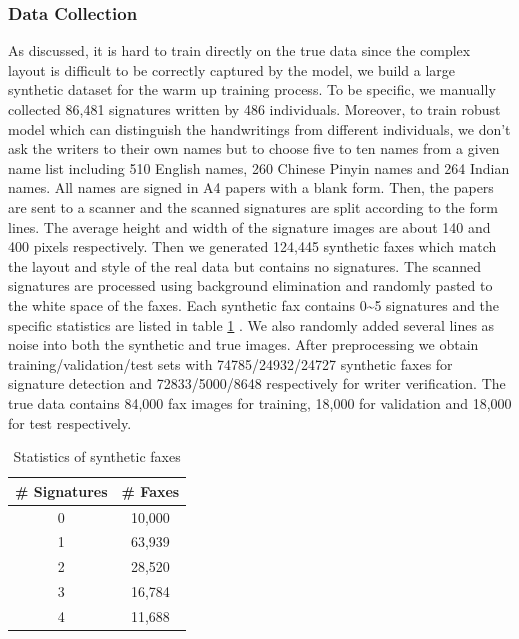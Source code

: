 \documentclass[sigconf]{acmart}
\begin{document}
\subsubsection*{\rm \textbf{Data Collection}}
As discussed, it is hard to train directly on the true data since the complex layout is difficult to be correctly captured by the model, we build a large synthetic dataset for the warm up training process. To be specific, we manually collected 86,481 signatures written by 486 individuals. Moreover, to train robust model which can distinguish the handwritings from different individuals, we don't ask the writers to their own names but to choose five to ten names from a given name list including 510 English names, 260 Chinese Pinyin names and 264 Indian names. All names are signed in A4 papers with a blank form. Then, the papers are sent to a scanner and the scanned signatures are split according to the form lines. The average height and width of the signature images are about 140 and 400 pixels respectively. Then we generated 124,445 synthetic faxes which match the layout and style of the real data but contains no signatures. The scanned signatures are processed using background elimination and randomly pasted to the white space of the faxes. Each synthetic fax contains 0\textasciitilde5 signatures and the specific statistics are listed in table \ref{stat sig} . We also randomly added several lines as noise into both the synthetic and true images. After preprocessing we obtain training/validation/test sets with 74785/24932/24727 synthetic faxes for signature detection and 72833/5000/8648 respectively for writer verification. The true data contains 84,000 fax images for training, 18,000 for validation and 18,000 for test respectively.
\begin{table}
	\caption{Statistics of synthetic faxes}
	\label{stat sig}
	\centering
	\begin{tabular}{cc}
		\toprule
		\textbf{\# Signatures} & \textbf{\# Faxes}\\
		\midrule
		0 & 10,000 \\
		1 & 63,939 \\
		2 & 28,520 \\
		3 & 16,784 \\
		4 & 11,688 \\
		\bottomrule
	\end{tabular}
\end{table}
\end{document}
